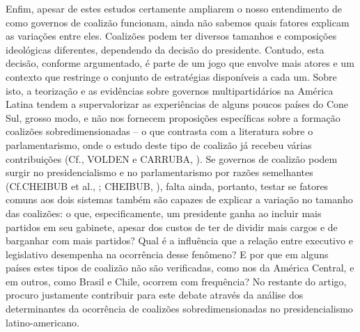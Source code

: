 Enfim, apesar de estes estudos certamente ampliarem o nosso entendimento de como governos de coalizão funcionam, ainda não sabemos quais fatores explicam as variações entre eles. Coalizões podem ter diversos tamanhos e composições ideológicas diferentes, dependendo da decisão do presidente. Contudo, esta decisão, conforme argumentado, é parte de um jogo que envolve mais atores e um contexto que restringe o conjunto de estratégias disponíveis a cada um. Sobre isto, a teorização e as evidências sobre governos multipartidários na América Latina tendem a supervalorizar as experiências de alguns poucos países do Cone Sul, grosso modo, e não nos fornecem proposições específicas sobre a formação coalizões sobredimensionadas -- o que contrasta com a literatura sobre o parlamentarismo, onde o estudo deste tipo de coalizão já recebeu várias contribuições (Cf., VOLDEN e CARRUBA, \citeyear{volden2004}). Se governos de coalizão podem surgir no presidencialismo e no parlamentarismo por razões semelhantes (Cf.CHEIBUB et al., \citeyear{cheibub2004}; CHEIBUB, \citeyear{cheibub2007}), falta ainda, portanto, testar se fatores comuns aos dois sistemas também são capazes de explicar a variação no tamanho das coalizões: o que, especificamente, um presidente ganha ao incluir mais partidos em seu gabinete, apesar dos custos de ter de dividir mais cargos e de barganhar com mais partidos? Qual é a influência que a relação entre executivo e legislativo desempenha na ocorrência desse fenômeno? E por que em alguns países estes tipos de coalizão não são verificadas, como nos da América Central, e em outros, como Brasil e Chile, ocorrem com frequência? No restante do artigo, procuro justamente contribuir para este debate através da análise dos determinantes da ocorrência de coalizões sobredimensionadas no presidencialismo latino-americano.

